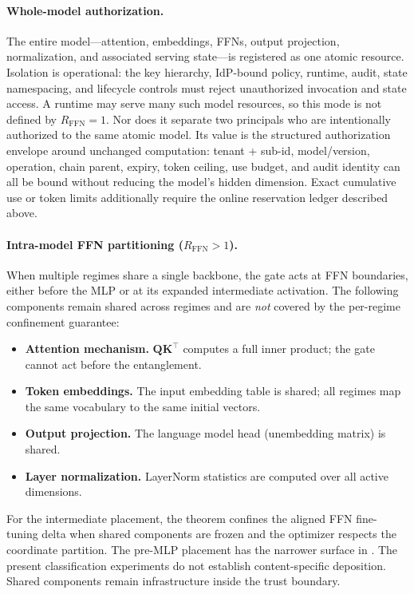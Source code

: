 \documentclass[11pt,a4paper]{article}
\newcommand{\bQ}{\mathbf{Q}}
\newcommand{\bK}{\mathbf{K}}
\begin{document}
\paragraph{Whole-model authorization.}
The entire model---attention, embeddings, FFNs, output projection,
normalization, and associated serving state---is registered as one
atomic resource.  Isolation is operational: the key hierarchy,
IdP-bound policy, runtime, audit, state namespacing, and lifecycle
controls must reject unauthorized invocation and state access.  A
runtime may serve many such model resources, so this mode is not
defined by $R_{\mathrm{FFN}}{=}1$.  Nor does it separate two
principals who are intentionally authorized to the same atomic model.
Its value is the structured authorization envelope around unchanged
computation: tenant + sub-id, model/version, operation, chain parent,
expiry, token ceiling, use budget, and audit identity can all be
bound without reducing the model's hidden dimension.  Exact cumulative
use or token limits additionally require the online reservation ledger
described above.

\paragraph{Intra-model FFN partitioning ($R_{\mathrm{FFN}}>1$).}
When multiple regimes share a single backbone, the gate acts at
FFN boundaries, either before the MLP or at its expanded intermediate
activation.  The following components remain shared across
regimes and are \emph{not} covered by the per-regime confinement
guarantee:

\begin{itemize}[nosep]
    \item \textbf{Attention mechanism.}  $\bQ\bK^\top$ computes a
    full inner product; the gate cannot act before the entanglement.
    \item \textbf{Token embeddings.}  The input embedding table is
    shared; all regimes map the same vocabulary to the same initial
    vectors.
    \item \textbf{Output projection.}  The language model head
    (unembedding matrix) is shared.
    \item \textbf{Layer normalization.}  LayerNorm statistics are
    computed over all active dimensions.
\end{itemize}

For the intermediate placement, the theorem confines the aligned FFN
fine-tuning delta when shared components are frozen and the optimizer
respects the coordinate partition.  The pre-MLP placement has the
narrower surface in .  The present
classification experiments do not establish content-specific
deposition.  Shared components remain infrastructure inside the
trust boundary.
\end{document}
